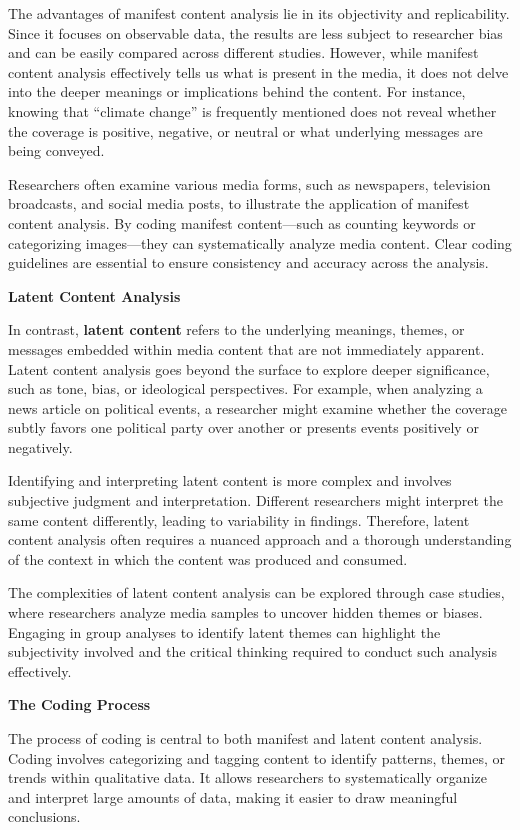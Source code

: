 \documentclass[
]{book}
\begin{document}
The advantages of manifest content analysis lie in its objectivity and replicability. Since it focuses on observable data, the results are less subject to researcher bias and can be easily compared across different studies. However, while manifest content analysis effectively tells us what is present in the media, it does not delve into the deeper meanings or implications behind the content. For instance, knowing that ``climate change'' is frequently mentioned does not reveal whether the coverage is positive, negative, or neutral or what underlying messages are being conveyed.

Researchers often examine various media forms, such as newspapers, television broadcasts, and social media posts, to illustrate the application of manifest content analysis. By coding manifest content---such as counting keywords or categorizing images---they can systematically analyze media content. Clear coding guidelines are essential to ensure consistency and accuracy across the analysis.

\textbf{Latent Content Analysis}

In contrast, \textbf{latent content} refers to the underlying meanings, themes, or messages embedded within media content that are not immediately apparent. Latent content analysis goes beyond the surface to explore deeper significance, such as tone, bias, or ideological perspectives. For example, when analyzing a news article on political events, a researcher might examine whether the coverage subtly favors one political party over another or presents events positively or negatively.

Identifying and interpreting latent content is more complex and involves subjective judgment and interpretation. Different researchers might interpret the same content differently, leading to variability in findings. Therefore, latent content analysis often requires a nuanced approach and a thorough understanding of the context in which the content was produced and consumed.

The complexities of latent content analysis can be explored through case studies, where researchers analyze media samples to uncover hidden themes or biases. Engaging in group analyses to identify latent themes can highlight the subjectivity involved and the critical thinking required to conduct such analysis effectively.

\textbf{The Coding Process}

The process of coding is central to both manifest and latent content analysis. Coding involves categorizing and tagging content to identify patterns, themes, or trends within qualitative data. It allows researchers to systematically organize and interpret large amounts of data, making it easier to draw meaningful conclusions.
\end{document}
